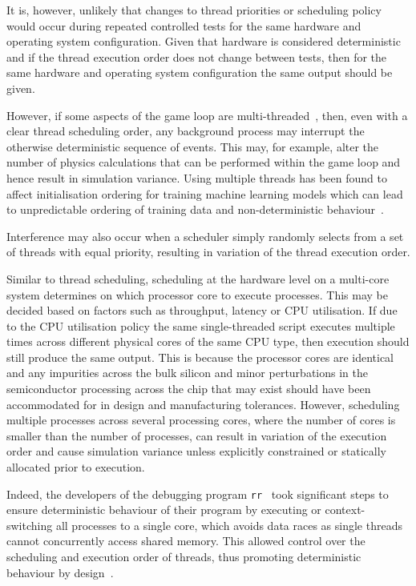 It is, however, unlikely that changes to thread priorities or scheduling policy would occur during repeated controlled tests for the same hardware and operating system configuration. Given that hardware is considered deterministic and if the thread execution order does not change between tests, then for the same hardware and operating system configuration the same output should be given.  

However, if some aspects of the game loop are multi-threaded~\cite{unity_multithreading}, then, even with a clear thread scheduling order, any background process may interrupt the otherwise deterministic sequence of events. This may, for example, alter the number of physics calculations that can be performed within the game loop and hence result in simulation variance.
%
Using multiple threads has been found to affect initialisation ordering for training machine learning models which can lead to unpredictable ordering of training data and non-deterministic behaviour~\cite{Sculley2015,Breck2017}.
%

Interference may also occur when a scheduler simply randomly selects from a set of threads with equal priority, resulting in variation of the thread execution order.

Similar to thread scheduling, scheduling at the hardware level on a multi-core system determines on which processor core to execute processes. This may be decided based on factors such as throughput, latency or CPU utilisation. 
%
If due to the CPU utilisation policy the same single-threaded script executes multiple times across different physical cores of the same CPU type,  then execution should still produce the same output. 
%
This is because the processor cores are identical and any impurities across the bulk silicon and minor perturbations in the semiconductor processing across the chip that may exist should have been accommodated for in design and manufacturing tolerances.
%
However, scheduling multiple processes across several processing cores, where the number of cores is smaller than the number of processes, can result in variation of the execution order and cause simulation variance unless explicitly constrained or statically allocated prior to execution. 

Indeed, the developers of the debugging program \texttt{rr}~\cite{RR_link} took significant steps to ensure deterministic behaviour of their program by executing or context-switching all processes to a single core, which avoids data races as single threads cannot concurrently access shared memory. This allowed control over the scheduling and execution order of threads, thus promoting deterministic behaviour by design~\cite{acm-q-rr-interview}.
%

